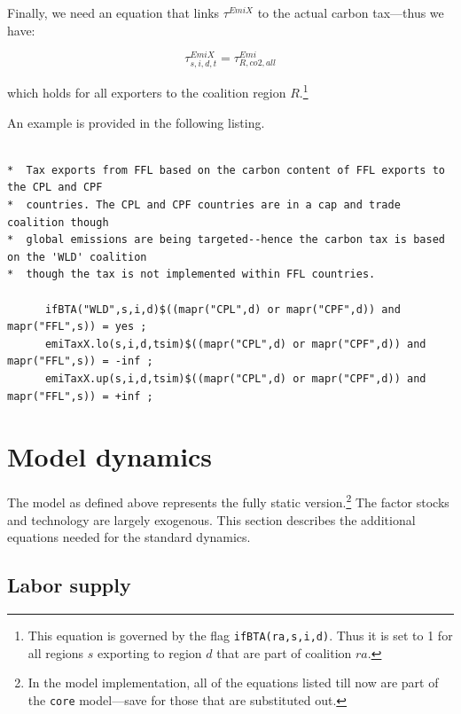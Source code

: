 \documentclass[11pt,letterpaper]{report}
\begin{document}
Finally, we need an equation that links
$\tau^{\mathit{EmiX}}$ to the actual
carbon tax---thus we have:

\begin{equation}
\label{eq:tauEmix}
\tau^{\mathit{EmiX}}_{s,i,d,t} = \tau^{\mathit{Emi}}_{R,\mathit{co2},\mathit{all}}
\end{equation}

\noindent which holds for all exporters
to the coalition region $R$.\footnote{This
equation is governed by the flag \texttt{ifBTA(ra,s,i,d)}.
Thus it is set to 1 for all regions $s$ exporting
to region $d$ that are part of coalition $\mathit{ra}$.}

An example is provided in the following listing.

\begin{lstlisting}[language=GAMS,
	caption={Border tax adjustment based on the
	carbon content of the exporter}, label=lst:BTA2]

*  Tax exports from FFL based on the carbon content of FFL exports to the CPL and CPF
*  countries. The CPL and CPF countries are in a cap and trade coalition though
*  global emissions are being targeted--hence the carbon tax is based on the 'WLD' coalition
*  though the tax is not implemented within FFL countries.

      ifBTA("WLD",s,i,d)$((mapr("CPL",d) or mapr("CPF",d)) and mapr("FFL",s)) = yes ;
      emiTaxX.lo(s,i,d,tsim)$((mapr("CPL",d) or mapr("CPF",d)) and mapr("FFL",s)) = -inf ;
      emiTaxX.up(s,i,d,tsim)$((mapr("CPL",d) or mapr("CPF",d)) and mapr("FFL",s)) = +inf ;

\end{lstlisting}

\chapter{Model dynamics}
\renewcommand{\theequation}{{G-}\arabic{equation}}
\setcounter{equation}{0}

The model as defined above represents the fully static version.\footnote{In the
model implementation, all of the equations listed till now are part of the
\texttt{core} model---save for those that are substituted out.} The factor
stocks and technology are largely exogenous. This section describes the
additional equations needed for the standard dynamics.

\section{Labor supply}
\end{document}
